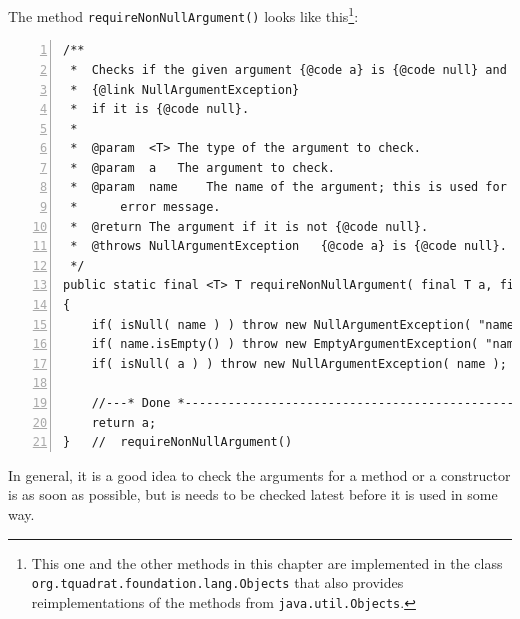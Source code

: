 \documentclass[11pt,a4paper, titlepage, parskip=half, headsepline, footsepline, cleardoublepage=current, headheight=1cm]{scrbook}
\begin{document}
The method \lstinline|requireNonNullArgument()| looks like this\footnote{This one and the other methods in this chapter are implemented in the class \lstinline|org.tquadrat.foundation.lang.Objects|\autocite{TQUADRAT_ORG_FOUNDATION_OBJECTS} that also provides reimplementations of the methods from \lstinline|java.util.Objects|.}:
\begin{lstlisting}[numbers=left,caption={requireNonNullArgument()}]
/**
 *  Checks if the given argument {@code a} is {@code null} and throws a
 *  {@link NullArgumentException}
 *  if it is {@code null}.
 *
 *  @param  <T> The type of the argument to check.
 *  @param  a   The argument to check.
 *  @param  name    The name of the argument; this is used for the 
 *      error message.
 *  @return The argument if it is not {@code null}.
 *  @throws NullArgumentException   {@code a} is {@code null}.
 */
public static final <T> T requireNonNullArgument( final T a, final String name )
{
    if( isNull( name ) ) throw new NullArgumentException( "name" );
    if( name.isEmpty() ) throw new EmptyArgumentException( "name" );
    if( isNull( a ) ) throw new NullArgumentException( name );

    //---* Done *----------------------------------------------------
    return a;
}   //  requireNonNullArgument()
\end{lstlisting}

In general, it is a good idea to check the arguments for a method or a constructor is as soon as possible, but is needs to be checked latest before it is used in some way.
\end{document}
